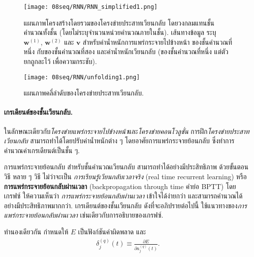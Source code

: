 \begin{figure}
	\begin{center}		
		\texttt{[image: 08seq/RNN/RNN\_simplified1.png]}	
		\caption[แผนภาพโครงสร้างโดยรวมของโครงข่ายประสาทเวียนกลับ]{แผนภาพโครงสร้างโดยรวมของโครงข่ายประสาทเวียนกลับ
		โดยวงกลมแทนชั้นคำนวณทั้งชั้น (โดยไม่ระบุจำนวนหน่วยคำนวณภายในชั้น).
		เส้นทางข้อมูล ระบุ $\bm{w}^{(1)}$, $\bm{w}^{(2)}$ และ $\bm{v}$
		สำหรับค่าน้ำหนักการแพร่กระจายไปข้างหน้า ของชั้นคำนวณที่หนึ่ง กับของชั้นคำนวณที่สอง 
		และค่าน้ำหนักเวียนกลับ (ของชั้นคำนวณที่หนึ่ง แต่ตัวยกถูกละไว้ เพื่อความกระชับ).
}
\label{fig: rnn simplified diagram}
\end{center}
\end{figure}
%

\begin{figure}
	\begin{center}		
		\texttt{[image: 08seq/RNN/unfolding1.png]}	
		\caption[แผนภาพคลี่ลำดับของโครงข่ายประสาทเวียนกลับ]{แผนภาพคลี่ลำดับของโครงข่ายประสาทเวียนกลับ.		
		}
		\label{fig: rnn unfolding diagram}
	\end{center}
\end{figure}
%

\paragraph{เกรเดียนต์ของชั้นเวียนกลับ.}
ในลักษณะเดียวกับ\textit{โครงข่ายแพร่กระจายไปข้างหน้า}และ\textit{โครงข่ายคอนโวลูชั่น}
การฝึก\textit{โครงข่ายประสาทเวียนกลับ}
สามารถทำได้โดยปรับค่าน้ำหนักต่าง ๆ โดยอาศัยการแพร่กระจายย้อนกลับ
ซึ่งทำการคำนวณค่าเกรเดียนต์เป็นชั้น ๆ.

การแพร่กระจายย้อนกลับ สำหรับชั้นคำนวณเวียนกลับ
สามารถทำได้อย่างมีประสิทธิภาพ ด้วยขั้นตอนวิธี หลาย ๆ วิธี\cite{Graves2012} 
ไม่ว่าจะเป็น
\textit{การเรียนรู้เวียนกลับเวลาจริง} (real time recurrent learning\cite{RobinsonFallside1987})
หรือ\textbf{การแพร่กระจายย้อนกลับผ่านเวลา} (backpropagation through time\cite{WilliamsZipser1995, Werbos1990} คำย่อ BPTT)
โดย เกรฟซ์\cite{Graves2012}  ให้ความเห็นว่า \textit{การแพร่กระจายย้อนกลับผ่านเวลา} เข้าใจได้ง่ายกว่า และสามารถคำนวณได้อย่างมีประสิทธิภาพมากกว่า.
เกรเดียนต์ของชั้นเวียนกลับ ดังที่จะอภิปรายต่อไปนี้ ใช้แนวทางของ\textit{การแพร่กระจายย้อนกลับผ่านเวลา} เช่นเดียวกับการอธิบายของเกรฟซ์\cite{Graves2012}.

ทำนองเดียวกัน กำหนดให้ $E$ เป็นฟังก์ชันค่าผิดพลาด
และ
\begin{eqnarray}
\delta_j^{(q)}(t) \equiv \frac{\partial E}{\partial a_j^{(q)}(t)}
\label{eq: RNN derivative delta} .
\end{eqnarray}

